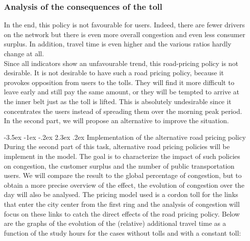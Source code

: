 \documentclass[a4paper, 12pt,oneside]{article}
\makeatletter
\renewcommand{\subsection}{\@startsection {subsection}{1}{\z@}%
             {-3.5ex \@plus -1ex \@minus -.2ex}%
             {2.3ex \@plus.2ex}%
             {\normalfont\normalsize\bfseries}}
\makeatother
\begin{document}
\subsubsection{Analysis of the consequences of the toll}
In the end, this policy is not favourable for users. Indeed, there are fewer drivers on the network but there is even more overall congestion and even less consumer surplus. In addition, travel time is even higher and the various ratios hardly change at all.\\

Since all indicators show an unfavourable trend, this road-pricing policy is not desirable. It is not desirable to have such a road pricing policy, because it provokes opposition from users to the tolls. They will find it more difficult to leave early and still pay the same amount, or they will be tempted to arrive at the inner belt just as the toll is lifted. This is absolutely undesirable since it concentrates the users instead of spreading them over the morning peak period. In the second part, we will propose an alternative to improve the situation.


\subsection{Implementation of the alternative road pricing policy}
During the second part of this task, alternative road pricing policies will be implement in the model. The goal is to characterize the impact of such policies on congestion, the customer surplus and the number of public transportation users. We will compare the result to the global percentage of congestion, but to obtain a more precise overview of the effect, the evolution of congestion over the day will also be analysed. 
The pricing model used is a cordon toll for the links that enter the city center from the first ring and the analysis of congestion will focus on these links to catch the direct effects of the road pricing policy.
Below are the graphs of the evolution of the (relative) additional travel time as a function of the study hours for the cases without tolls and with a constant toll:
\end{document}
